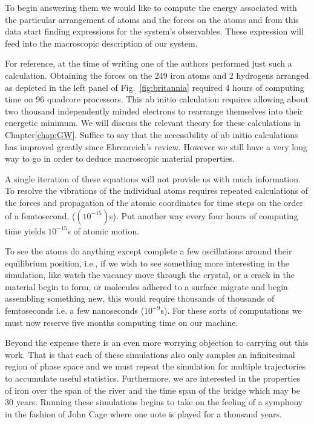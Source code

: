 To begin answering them we would like to compute the energy associated with the particular 
arrangement of atoms and the forces on the atoms and from this data start finding expressions
for the system's observables. These expression will feed into the macroscopic description of our system.

For reference, at the time of writing one of the authors performed just such a calculation. Obtaining  
the forces on the 249 iron atoms and 2 hydrogens arranged as depicted in the left panel of 
Fig.~\ref{fig:britannia} required 4 hours of computing time on 96 quadcore processors.
This ab initio calculation requires allowing about two thousand independently minded electrons
to rearrange themselves into their energetic minimum. We will discuss the relevant
theory for these calculations in Chapter\ref{chap:GW}. Suffice to say that the accessibility
of ab initio calculations has improved greatly since Ehrenreich's review.
However we still have a very long way to go in order to deduce macroscopic material properties.

A single iteration of these equations will not provide us with 
much information. To resolve the vibrations of the individual atoms  
requires repeated calculations of the forces and propagation of the atomic coordinates
for time steps on the order of a femtosecond, ($(10^{-15})$s).
Put another way every four hours of computing time yields $10^{-15}$s
of atomic motion.

To see the atoms do anything except complete a few oscillations around
their equilibrium position, i.e., if we wish to see something more interesting
in the simulation, like watch the vacancy
move through the crystal, or a crack in the material begin to form, or
molecules adhered to a surface migrate and begin assembling something new,
this would require thousands of thousands of femtoseconds i.e. a few nanoseconds ($10^{-9}$s).
For these sorts of computations we must now reserve five months computing time on our machine.

Beyond the expense there is an even more worrying objection to carrying out this work. That is that 
each of these simulations also only samples an infinitesimal region of phase space
and we must repeat the simulation for multiple trajectories to accumulate useful statistics.
Furthermore, we are interested in the properties of iron over the span of the river and the 
time span of the bridge which may be 30 years. Running these simulations begins to take on
the feeling of a symphony in the fashion of John Cage where one note is played for a thousand years.

